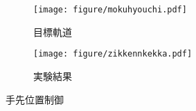 \begin{figure}[H]
    \centering
    \begin{subfigure}[b]{0.45\linewidth}
        \centering
        \texttt{[image: figure/mokuhyouchi.pdf]}
        \caption{目標軌道}
    \end{subfigure}
    \begin{subfigure}[b]{0.45\linewidth}
        \centering
        \texttt{[image: figure/zikkennkekka.pdf]}
        \caption{実験結果}
    \end{subfigure}
    \caption{手先位置制御}
    \label{fig:xy_flower_result}
\end{figure}
